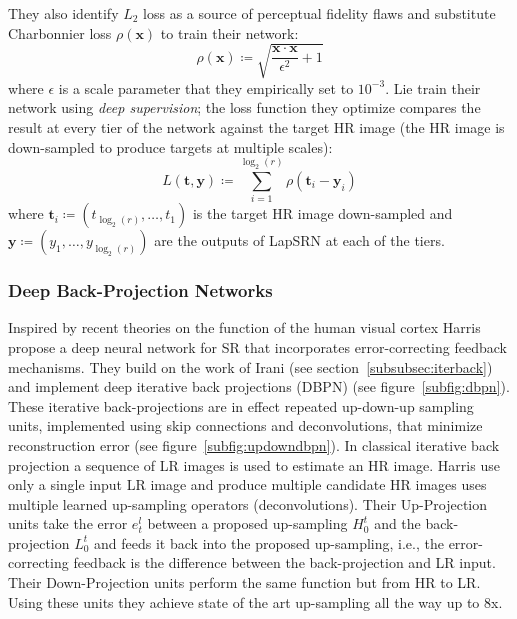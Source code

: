 They also identify \(L_2\) loss as a source of perceptual fidelity flaws and substitute Charbonnier loss\cite{charbonnier1994two} \(\rho(\bm{x})\) to train their network:
\begin{equation}
    \rho(\bm{x}) \coloneqq \sqrt{\frac{\bm{x}\cdot \bm{x}}{\epsilon^2}+ 1}
\end{equation}
where \(\epsilon\) is a scale parameter that they empirically set to \(10^{-3}\). 
%
Lie \etal train their network using \textit{deep supervision}; the loss function they optimize compares the result at every tier of the network against the target HR image (the HR image is down-sampled to produce targets at multiple scales):
\begin{equation}
    L(\bm{t}, \bm{y}) \coloneqq \sum_{i=1}^{\log_2(r)} \rho(\bm{t}_i - \bm{y}_i)
\end{equation}
where \(\bm{t}_i \coloneqq (t_{\log_2{(r)}}, \dots, t_1)\) is the target HR image down-sampled and \(\bm{y} \coloneqq (y_1, \dots, y_{\log_2(r)})\) are the outputs of LapSRN at each of the tiers.
\subsubsection{Deep Back-Projection Networks}\label{subsubsec:dbpn}

Inspired by recent theories on the function of the human visual cortex\cite{kravitz2013ventral} Harris \etal\cite{haris2018deep} propose a deep neural network for SR that incorporates error-correcting feedback mechanisms.
%
They build on the work of Irani \etal (see section~\ref{subsubsec:iterback}) and implement deep iterative back projections (DBPN) (see figure~\ref{subfig:dbpn}).
%
These iterative back-projections are in effect repeated up-down-up sampling units, implemented using skip connections and deconvolutions, that minimize reconstruction error (see figure~\ref{subfig:updowndbpn}).
%
In classical iterative back projection a sequence of LR images is used to estimate an HR image.
%
Harris \etal use only a single input LR image and produce multiple candidate HR images uses multiple learned up-sampling operators (deconvolutions).
%
Their Up-Projection units take the error \(e_t^l\) between a proposed up-sampling \(H_0^t\) and the back-projection \(L_0^t\) and feeds it back into the proposed up-sampling, i.e., the error-correcting feedback is the difference between the back-projection and LR input.
%
Their Down-Projection units perform the same function but from HR to LR.
%
Using these units they achieve state of the art up-sampling all the way up to 8x\cite{timofte2018ntire}.
